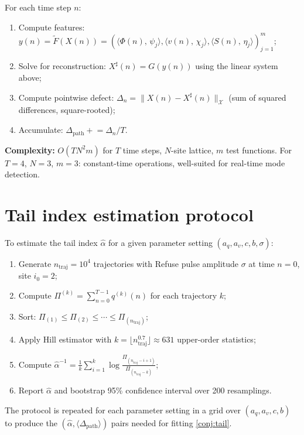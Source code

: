 \documentclass[12pt, oneside]{memoir}
\newcommand{\X}{\mathcal{X}}
\newcommand{\Ft}{\widetilde{F}}
\newcommand{\Dpth}{\Delta_{\mathrm{path}}}
\newcommand{\nnorm}[1]{\lVert #1 \rVert}
\newcommand{\ip}[2]{\langle #1,\, #2 \rangle}
\newcommand{\aq}{a_q}
\newcommand{\av}{a_v}
\begin{document}
For each time step $n$:
\begin{enumerate}
  \item Compute features: $y(n) = \Ft(X(n)) = (\ip{\Phi(n)}{\psi_j},
        \ip{v(n)}{\chi_j}, \ip{S(n)}{\eta_j})_{j=1}^m$;
  \item Solve for reconstruction: $X^\sharp(n) = G(y(n))$ using the linear system above;
  \item Compute pointwise defect: $\Delta_n = \nnorm{X(n) - X^\sharp(n)}_\X$
        (sum of squared differences, square-rooted);
  \item Accumulate: $\Dpth \mathrel{+}= \Delta_n / T$.
\end{enumerate}

\textbf{Complexity:} $O(T N^2 m)$ for $T$ time steps, $N$-site lattice, $m$ test
functions.  For $T=4$, $N=3$, $m=3$: constant-time operations, well-suited for real-time
mode detection.

\section{Tail index estimation protocol}

To estimate the tail index $\hat\alpha$ for a given parameter setting
$(\aq, \av, c, b, \sigma)$:
\begin{enumerate}
  \item Generate $n_{\mathrm{traj}} = 10^4$ trajectories with Refuse pulse amplitude
        $\sigma$ at time $n=0$, site $i_0 = 2$;
  \item Compute $\Pi^{(k)} = \sum_{n=0}^{T-1} q^{(k)}(n)$ for each trajectory $k$;
  \item Sort: $\Pi_{(1)} \le \Pi_{(2)} \le \cdots \le \Pi_{(n_{\mathrm{traj}})}$;
  \item Apply Hill estimator with $k = \lfloor n_{\mathrm{traj}}^{0.7} \rfloor \approx
        631$ upper-order statistics;
  \item Compute $\hat\alpha^{-1} = \frac{1}{k} \sum_{i=1}^k \log
        \frac{\Pi_{(n_{\mathrm{traj}}-i+1)}}{\Pi_{(n_{\mathrm{traj}}-k)}}$;
  \item Report $\hat\alpha$ and bootstrap 95\% confidence interval over 200 resamplings.
\end{enumerate}

The protocol is repeated for each parameter setting in a grid over $(\aq, \av, c, b)$
to produce the $(\hat\alpha, \langle\Dpth\rangle)$ pairs needed for fitting
\cref{conj:tail}.
\end{document}
